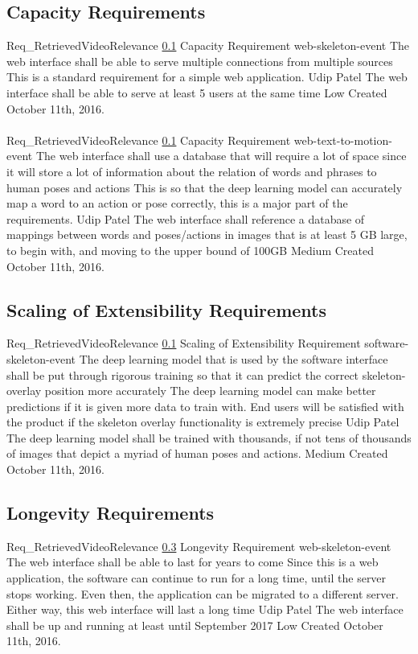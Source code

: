 \documentclass{scrreprt}
\begin{document}
\subsection{Capacity Requirements}
\label{req-capacity}

\requirement
{Req_RetrievedVideoRelevance}
{\ref{req-capacity} Capacity Requirement}
{web-skeleton-event}
{The web interface shall be able to serve multiple connections from multiple sources}
{This is a standard requirement for a simple web application.}
{Udip Patel}
{The web interface shall be able to serve at least 5 users at the same time}
{Low}
{Created October 11th, 2016.}
\\ \\

\requirement
{Req_RetrievedVideoRelevance}
{\ref{req-capacity} Capacity Requirement}
{web-text-to-motion-event}
{The web interface shall use a database that will require a lot of space since it will store a lot of information about the relation of words and phrases to human poses and actions}
{This is so that the deep learning model can accurately map a word to an action or pose correctly, this is a major part of the requirements.}
{Udip Patel}
{The web interface shall reference a database of mappings between words and poses/actions in images that is at least 5 GB large, to begin with, and moving to the upper bound of 100GB}
{Medium}
{Created October 11th, 2016.}


\subsection{Scaling of Extensibility Requirements}
\label{req-scaling}

\requirement
{Req_RetrievedVideoRelevance}
{\ref{req-capacity} Scaling of Extensibility Requirement}
{software-skeleton-event}
{The deep learning model that is used by the software interface shall be put through rigorous training so that it can predict the correct skeleton-overlay position more accurately}
{The deep learning model can make better predictions if it is given more data to train with. End users will be satisfied with the product if the skeleton overlay functionality is extremely precise}
{Udip Patel}
{The deep learning model shall be trained with thousands, if not tens of thousands of images that depict a myriad of human poses and actions.}
{Medium}
{Created October 11th, 2016.}



\subsection{Longevity Requirements}
\label{req-longevity}
\requirement
{Req_RetrievedVideoRelevance}
{\ref{req-longevity} Longevity Requirement}
{web-skeleton-event}
{The web interface shall be able to last for years to come}
{Since this is a web application, the software can continue to run for a long time, until the server stops working. Even then, the application can be migrated to a different server. Either way, this web interface will last a long time}
{Udip Patel}
{The web interface shall be up and running at least until September 2017}
{Low}
{Created October 11th, 2016.}
\end{document}
